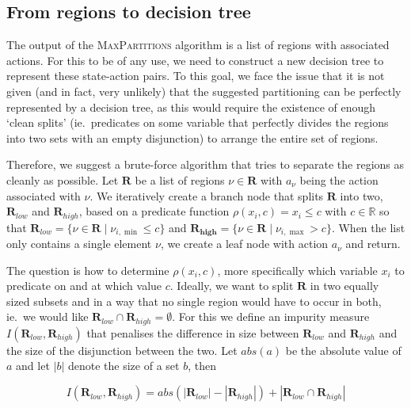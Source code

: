 \subsection{From regions to decision tree}%
\label{sub:regionsToDT}

The output of the \textsc{MaxPartitions} algorithm is a list of regions with
associated actions. For this to be of any use, we need to construct a new
decision tree to represent these state-action pairs. To this goal, we face the
issue that it is not given (and in fact, very unlikely) that the suggested
partitioning can be perfectly represented by a decision tree, as this would
require the existence of enough `clean splits' (ie.\ predicates on some variable
that perfectly divides the regions into two sets with an empty disjunction) to
arrange the entire set of regions.

Therefore, we suggest a brute-force algorithm that tries to separate the regions
as cleanly as possible. Let $\mathbf{R}$ be a list of regions $\nu \in
\mathbf{R}$ with $a_{\nu}$ being the action associated with $\nu$. We
iteratively create a branch node that splits $\mathbf{R}$ into two,
$\mathbf{R}_{low}$ and $\mathbf{R}_{high}$, based on a predicate function
$\rho(x_i,c) = x_i \le c$ with $c \in \mathbb{R}$ so that $\mathbf{R}_{low} = \{
\nu \in \mathbf{R} \mid \nu_{i,\min} \le c \}$ and $\mathbf{R_{high}} = \{ \nu
\in \mathbf{R} \mid \nu_{i,\max} > c \}$. When the list only contains a single
element $\nu$, we create a leaf node with action $a_{\nu}$ and return.

The question is how to determine $\rho(x_i,c)$, more specifically which variable
$x_i$ to predicate on and at which value $c$. Ideally, we want to split
$\mathbf{R}$ in two equally sized subsets and in a way that no single region
would have to occur in both, ie.\ we would like $\mathbf{R}_{low} \cap
\mathbf{R}_{high} = \emptyset$. For this we define an impurity measure
$I(\mathbf{R}_{low},\mathbf{R}_{high})$ that penalises the difference in size
between $\mathbf{R}_{low}$ and $\mathbf{R}_{high}$ and the size of the
disjunction between the two. Let $abs(a)$ be the absolute value of $a$ and let
$|b|$ denote the size of a set $b$, then

\[
    I(\mathbf{R}_{low}, \mathbf{R}_{high})  = abs(|\mathbf{R}_{low}| -
    |\mathbf{R}_{high}|) + |\mathbf{R}_{low} \cap \mathbf{R}_{high}|
\]


